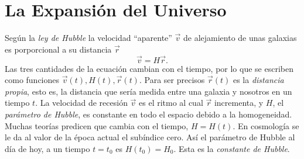 \documentclass[a4paper,openright,12pt]{book}
\begin{document}
\section{La Expansión del Universo}
Según la \textit{ley de Hubble} \cite{1.1} la velocidad ``aparente'' $\vec{v}$ de alejamiento de unas galaxias es porporcional a su distancia $\vec{r}$
\begin{equation}
\vec{v} = H\vec{r}.\label{eqn 1.1}
\end{equation}
Las tres cantidades de la ecuación cambian con el tiempo, por lo que se escriben como funciones $\vec{v}(t), H(t), \vec{r}(t)$. Para ser precisos $\vec{r}(t)$ es la \textit{distancia propia}, esto es, la distancia que sería medida entre una galaxia y nosotros en un tiempo $t$. La velocidad de recesión $\vec{v}$ es el ritmo al cual $\vec{r}$ incrementa, y $H$, el \textit{parámetro de Hubble}, es constante en todo el espacio debido a la homogeneidad. Muchas teorías predicen que cambia con el tiempo, $H = H(t)$. En cosmología se le da al valor de la época actual el subíndice cero. Así el parámetro de Hubble al día de hoy, a un tiempo $t= t_{0}$ es $H(t_{0})= H_{0}$. Esta es la \textit{constante de Hubble}.
\end{document}
